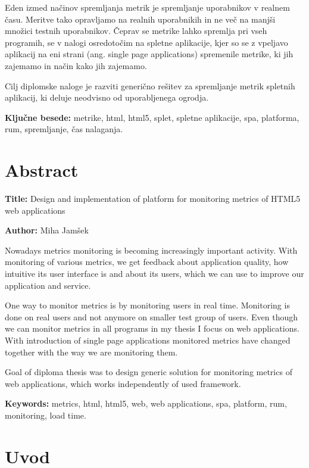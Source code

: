 \documentclass[a4paper, 12pt]{book}
\newcommand{\ttitleEn}{Design and implementation of platform for monitoring metrics of HTML5 web applications}
\newcommand{\tauthor}{Miha Jamšek}
\newcommand{\tkeywords}{metrike, html, html5, splet, spletne aplikacije, spa, platforma, rum, spremljanje, čas nalaganja}
\newcommand{\tkeywordsEn}{metrics, html, html5, web, web applications, spa, platform, rum, monitoring, load time}
\newcommand{\clearemptydoublepage}{\newpage{\pagestyle{empty}\cleardoublepage}}
\begin{document}
Eden izmed načinov spremljanja metrik je spremljanje uporabnikov v realnem času. Meritve tako opravljamo na realnih uporabnikih in ne več na manjši množici testnih uporabnikov. Čeprav se metrike lahko spremlja pri vseh programih, se v nalogi osredotočim na spletne aplikacije, kjer so se z  vpeljavo aplikacij na eni strani (ang. single page applications) spremenile metrike, ki jih zajemamo in način kako jih zajemamo.

Cilj diplomske naloge je razviti generično rešitev za spremljanje metrik spletnih aplikacij, ki deluje neodvisno od uporabljenega ogrodja.


\bigskip

\noindent\textbf{Ključne besede:} \tkeywords.
\clearemptydoublepage

\chapter*{Abstract}

\noindent\textbf{Title:} \ttitleEn
\bigskip

\noindent\textbf{Author:} \tauthor
\bigskip

\noindent
Nowadays metrics monitoring is becoming increasingly important activity. With monitoring of various metrics, we get feedback about application quality, how intuitive its user interface is and about its users, which we can use to improve our application and service.
 
One way to monitor metrics is by monitoring users in real time. Monitoring is done on real users and not anymore on smaller test group of users. Even though we can monitor metrics in all programs in my thesis I focus on web applications. With introduction of single page applications monitored metrics have changed together with the way we are monitoring them.

Goal of diploma thesis was to design generic solution for monitoring metrics of web applications, which works independently of used framework.


\bigskip

\noindent\textbf{Keywords:} \tkeywordsEn.
\clearemptydoublepage

\mainmatter
\setcounter{page}{1}
\pagestyle{fancy}

\chapter{Uvod}
\end{document}
